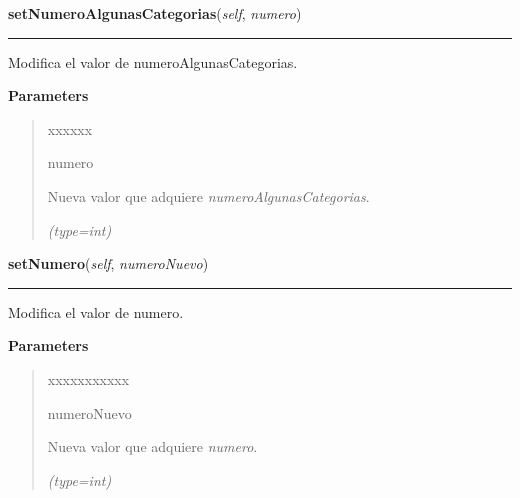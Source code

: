 \hspace{.8\funcindent}\begin{boxedminipage}{\funcwidth}

    \raggedright \textbf{setNumeroAlgunasCategorias}(\textit{self}, \textit{numero})

    \vspace{-1.5ex}

    \rule{\textwidth}{0.5\fboxrule}
\setlength{\parskip}{2ex}
    Modifica el valor de numeroAlgunasCategorias.

\setlength{\parskip}{1ex}
      \textbf{Parameters}
      \vspace{-1ex}

      \begin{quote}
        \begin{Ventry}{xxxxxx}

          \item[numero]

          Nueva valor que adquiere \textit{numeroAlgunasCategorias}.

            {\it (type=int)}

        \end{Ventry}

      \end{quote}

    \end{boxedminipage}

    \label{grafo:Grafo:setNumero}

    \vspace{0.5ex}

\hspace{.8\funcindent}\begin{boxedminipage}{\funcwidth}

    \raggedright \textbf{setNumero}(\textit{self}, \textit{numeroNuevo})

    \vspace{-1.5ex}

    \rule{\textwidth}{0.5\fboxrule}
\setlength{\parskip}{2ex}
    Modifica el valor de numero.

\setlength{\parskip}{1ex}
      \textbf{Parameters}
      \vspace{-1ex}

      \begin{quote}
        \begin{Ventry}{xxxxxxxxxxx}

          \item[numeroNuevo]

          Nueva valor que adquiere \textit{numero}.

            {\it (type=int)}

        \end{Ventry}

      \end{quote}

    \end{boxedminipage}

